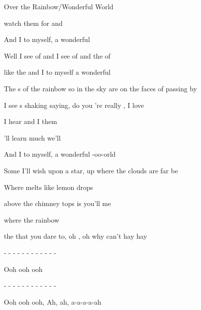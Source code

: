\begin{SBSong}{Over the Rainbow/Wonderful World}{}
\begin{SBVerse}
     watch them  for  and 
    
    And I  to myself,  a wonderful  
    
    Well I see  of  and I see  of  and the  of 
    
     like the  and I  to myself  a wonderful   
  \end{SBVerse}
  \begin{SBVerse}
    The s of the rainbow so  in the sky are  on the faces of  passing by
    
    I see s shaking  saying,  do you  're really  , I love 
    
    I hear   and I  them  
    
    'll learn much   we'll 
    
    And I  to myself,  a wonderful  -oo-orld
  \end{SBVerse}
  \begin{SBVerse}
    Some  I'll wish upon a star,  up where the clouds are far be 
    
    Where  melts like lemon drops
    
     above the chimney tops is  you'll  me
    
    where  the rainbow  
    
     the  that you dare to, oh , oh why can't   hay hay
  \end{SBVerse}
  \begin{SBVerse}
     - - -  - - -  - - -  - - -
    
    Ooh ooh ooh
    
     - - -  - - -  - - -  - - -
    
    Ooh ooh ooh, Ah, ah, a-a-a-a-ah
  \end{SBVerse}
\end{SBSong}


